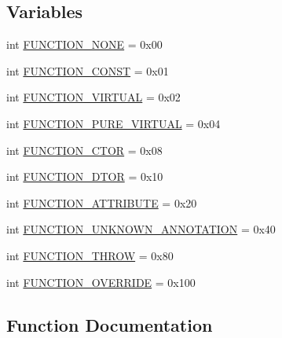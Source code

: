 \subsection*{Variables}
\begin{DoxyCompactItemize}
\item 
int \mbox{\hyperlink{namespacecpp_1_1ast_a8f1229df8e1348664a7e6142c2d0ae0b}{F\+U\+N\+C\+T\+I\+O\+N\+\_\+\+N\+O\+NE}} = 0x00
\item 
int \mbox{\hyperlink{namespacecpp_1_1ast_a73fe57808e7f2e3f3e9d0e1088f183be}{F\+U\+N\+C\+T\+I\+O\+N\+\_\+\+C\+O\+N\+ST}} = 0x01
\item 
int \mbox{\hyperlink{namespacecpp_1_1ast_a7d444baf6763d374aa4ef9c3f0e6d5b3}{F\+U\+N\+C\+T\+I\+O\+N\+\_\+\+V\+I\+R\+T\+U\+AL}} = 0x02
\item 
int \mbox{\hyperlink{namespacecpp_1_1ast_ae8f597c9a3e49e1a29e8da1848d40ff1}{F\+U\+N\+C\+T\+I\+O\+N\+\_\+\+P\+U\+R\+E\+\_\+\+V\+I\+R\+T\+U\+AL}} = 0x04
\item 
int \mbox{\hyperlink{namespacecpp_1_1ast_ae380e31bf1bce9757f3289a704715c2d}{F\+U\+N\+C\+T\+I\+O\+N\+\_\+\+C\+T\+OR}} = 0x08
\item 
int \mbox{\hyperlink{namespacecpp_1_1ast_a4491e62237a2689be078bf3b455549e6}{F\+U\+N\+C\+T\+I\+O\+N\+\_\+\+D\+T\+OR}} = 0x10
\item 
int \mbox{\hyperlink{namespacecpp_1_1ast_a6462424cd2b9884f63bf7594811321cd}{F\+U\+N\+C\+T\+I\+O\+N\+\_\+\+A\+T\+T\+R\+I\+B\+U\+TE}} = 0x20
\item 
int \mbox{\hyperlink{namespacecpp_1_1ast_a9d3ba548a6c733892e60c8accdc96639}{F\+U\+N\+C\+T\+I\+O\+N\+\_\+\+U\+N\+K\+N\+O\+W\+N\+\_\+\+A\+N\+N\+O\+T\+A\+T\+I\+ON}} = 0x40
\item 
int \mbox{\hyperlink{namespacecpp_1_1ast_a3384f360da38e3df526d189238118fb5}{F\+U\+N\+C\+T\+I\+O\+N\+\_\+\+T\+H\+R\+OW}} = 0x80
\item 
int \mbox{\hyperlink{namespacecpp_1_1ast_aecf2f8a17fb10fe367d2da84849c06c9}{F\+U\+N\+C\+T\+I\+O\+N\+\_\+\+O\+V\+E\+R\+R\+I\+DE}} = 0x100
\end{DoxyCompactItemize}


\subsection{Function Documentation}
\mbox{\label{namespacecpp_1_1ast_a696471f0d7971a0789824803a008cf6b}} 
